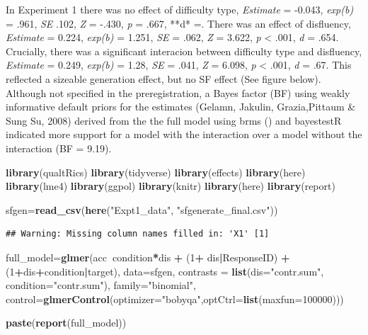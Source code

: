 \documentclass[pdf]{apa6}
\newenvironment{Shaded}{\begin{snugshade}}{\end{snugshade}}
\newcommand{\DataTypeTok}[1]{\textcolor[rgb]{0.13,0.29,0.53}{#1}}
\newcommand{\DecValTok}[1]{\textcolor[rgb]{0.00,0.00,0.81}{#1}}
\newcommand{\KeywordTok}[1]{\textcolor[rgb]{0.13,0.29,0.53}{\textbf{#1}}}
\newcommand{\NormalTok}[1]{#1}
\newcommand{\OperatorTok}[1]{\textcolor[rgb]{0.81,0.36,0.00}{\textbf{#1}}}
\newcommand{\StringTok}[1]{\textcolor[rgb]{0.31,0.60,0.02}{#1}}
\begin{document}
In Experiment 1 there was no effect of difficulty type, \emph{Estimate} = -0.043, \emph{exp(b)} = .961, \emph{SE} .102, \emph{Z} = -.430, \emph{p} = .667, **d* =. There was an effect of disfluency, \emph{Estimate} = 0.224, \emph{exp(b)} = 1.251, \emph{SE} = .062, \emph{Z} = 3.622, \emph{p} \textless{} .001, \emph{d} = .654. Crucially, there was a significant interacion between difficulty type and disfluency, \emph{Estimate} = 0.249, \emph{exp(b)} = 1.28, \emph{SE} = .041, \emph{Z} = 6.098, \emph{p} \textless{} .001, \emph{d} = .67. This reflected a sizeable generation effect, but no SF effect (See figure below). Although not specified in the preregistration, a Bayes factor (BF) using weakly informative default priors for the estimates (Gelamn, Jakulin, Grazia,Pittaum \& Sung Su, 2008) derived from the the full model using brms () and bayestestR indicated more support for a model with the interaction over a model without the interaction (BF = 9.19).

\begin{Shaded}
\begin{Highlighting}[]
\KeywordTok{library}\NormalTok{(qualtRics)}
\KeywordTok{library}\NormalTok{(tidyverse)}
\KeywordTok{library}\NormalTok{(effects)}
\KeywordTok{library}\NormalTok{(here)}
\KeywordTok{library}\NormalTok{(lme4)}
\KeywordTok{library}\NormalTok{(ggpol)}
\KeywordTok{library}\NormalTok{(knitr)}
\KeywordTok{library}\NormalTok{(here)}
\KeywordTok{library}\NormalTok{(report)}

\NormalTok{sfgen=}\KeywordTok{read_csv}\NormalTok{(}\KeywordTok{here}\NormalTok{(}\StringTok{"Expt1_data"}\NormalTok{, }\StringTok{"sfgenerate_final.csv"}\NormalTok{))}
\end{Highlighting}
\end{Shaded}

\begin{verbatim}
## Warning: Missing column names filled in: 'X1' [1]
\end{verbatim}

\begin{Shaded}
\begin{Highlighting}[]
\NormalTok{full_model=}\KeywordTok{glmer}\NormalTok{(acc}\OperatorTok{~}\NormalTok{condition}\OperatorTok{*}\NormalTok{dis }\OperatorTok{+}\StringTok{ }\NormalTok{(}\DecValTok{1}\OperatorTok{+}\StringTok{ }\NormalTok{dis}\OperatorTok{|}\NormalTok{ResponseID) }\OperatorTok{+}\StringTok{ }\NormalTok{(}\DecValTok{1}\OperatorTok{+}\NormalTok{dis}\OperatorTok{+}\NormalTok{condition}\OperatorTok{|}\NormalTok{target), }\DataTypeTok{data=}\NormalTok{sfgen, }\DataTypeTok{contrasts =} \KeywordTok{list}\NormalTok{(}\DataTypeTok{dis=}\StringTok{"contr.sum"}\NormalTok{, }\DataTypeTok{condition=}\StringTok{"contr.sum"}\NormalTok{), }\DataTypeTok{family=}\StringTok{"binomial"}\NormalTok{, }\DataTypeTok{control=}\KeywordTok{glmerControl}\NormalTok{(}\DataTypeTok{optimizer=}\StringTok{"bobyqa"}\NormalTok{,}\DataTypeTok{optCtrl=}\KeywordTok{list}\NormalTok{(}\DataTypeTok{maxfun=}\DecValTok{100000}\NormalTok{)))}



\KeywordTok{paste}\NormalTok{(}\KeywordTok{report}\NormalTok{(full_model))}
\end{Highlighting}
\end{Shaded}
\end{document}
